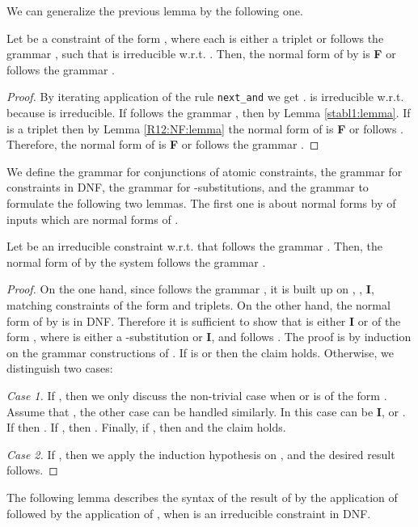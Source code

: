 \documentclass[submission,copyright,creativecommons]{eptcs}
\numberwithin{subcase}{case}
\begin{document}
We can generalize the previous lemma by the following one.
\begin{lemma}
\label{stabl2:lemma}
Let  be a constraint of the form , where each 
 is either a triplet or follows 
the grammar , such that  is irreducible w.r.t.  
.
Then, the normal form of  by 
is \textbf{F} or follows the  grammar .
\end{lemma}
\begin{proof}
By iterating application of the rule \texttt{next\_and} we get
.
 is irreducible w.r.t.   because  is
irreducible. If  follows the grammar , then
 by Lemma \ref{stabl1:lemma}. If  is a triplet  
then  by  Lemma \ref{R12:NF:lemma} the normal form of 
is \textbf{F} or follows . Therefore, the normal form of
  is \textbf{F} or follows  the  grammar
 .
\end{proof}

We define the grammar  for conjunctions of atomic constraints,
the grammar  for
constraints in DNF, the grammar  for -substitutions,
and the grammar  to formulate the following two lemmas. The first one is
about normal forms by  of inputs which are normal forms of .

\begin{lemma}
\label{R123:NF:lemma}
Let  be an irreducible  constraint w.r.t. 
 that follows  the grammar . Then, the normal form of  by the system
  follows the grammar .
\end{lemma}
\begin{proof}
On the one hand, since  follows the grammar , it is built
up on , , \textbf{I}, matching constraints of the form
 and triplets. On the other hand, the normal form of  by
  is in DNF. Therefore it is sufficient to show that
 is either \textbf{I} or of the
form , where  is either a -substitution or
\textbf{I}, and  follows  . The  proof is by   induction on the
grammar constructions of . If   is  or 
then the claim holds.
Otherwise, we distinguish two cases:

\noindent \emph{Case 1.} If   , then we only discuss the
non-trivial case when  or  is of the form .
Assume that  , the  other case
can be handled similarly.
In this case  can be \textbf{I},  or .
If  then 
. 
If , then 
. 
Finally, if , then  and the claim holds.

\noindent \emph{Case 2.} If , then  we apply the
induction hypothesis on , and the desired result follows. 
\end{proof}

The following lemma describes the syntax of the result of
 by the application of 
followed by the application of , when  is an irreducible
constraint in DNF.
\end{document}
